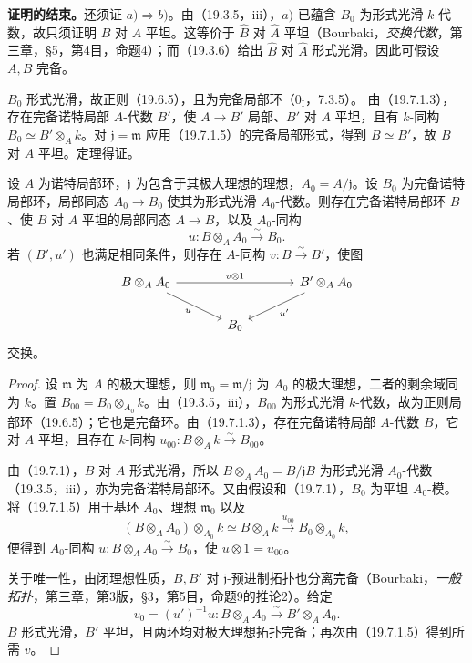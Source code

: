 \textbf{证明的结束。}还须证 $a)\Rightarrow b)$。由（19.3.5，iii），$a)$ 已蕴含 $B_0$ 为形式光滑 $k$-代数，故只须证明 $B$ 对 $A$ 平坦。这等价于 $\widehat B$ 对 $\widehat A$ 平坦（Bourbaki，\textit{交换代数}，第三章，§5，第4目，命题4）；而（19.3.6）给出 $\widehat B$ 对 $\widehat A$ 形式光滑。因此可假设 $A,B$ 完备。

$B_0$ 形式光滑，故正则（19.6.5），且为完备局部环（$0_{\mathrm I}$，7.3.5）。
由（19.7.1.3），存在完备诺特局部 $A$-代数 $B'$，使 $A\to B'$ 局部、$B'$ 对 $A$ 平坦，且有 $k$-同构 $B_0\simeq B'\otimes_Ak$。对 $\mathfrak j=\mathfrak m$ 应用（19.7.1.5）的完备局部形式，得到 $B\simeq B'$，故 $B$ 对 $A$ 平坦。定理得证。\finishproof

设 $A$ 为诺特局部环，$\mathfrak j$ 为包含于其极大理想的理想，$A_0=A/\mathfrak j$。设 $B_0$ 为完备诺特局部环，局部同态 $A_0\to B_0$ 使其为形式光滑 $A_0$-代数。则存在完备诺特局部环 $B$、使 $B$ 对 $A$ 平坦的局部同态 $A\to B$，以及 $A_0$-同构
\[
 u:B\otimes_AA_0\xrightarrow{\sim}B_0.
\]
若 $(B',u')$ 也满足相同条件，则存在 $A$-同构 $v:B\xrightarrow{\sim}B'$，使图
\[
\begin{tikzcd}[column sep=large]
 B\otimes_AA_0\arrow[rr,"v\otimes1"]\arrow[dr,"u"']&&
 B'\otimes_AA_0\arrow[dl,"u'"]\\
 &B_0&
\end{tikzcd}
\]
交换。

\begin{proof}
设 $\mathfrak m$ 为 $A$ 的极大理想，则 $\mathfrak m_0=\mathfrak m/\mathfrak j$ 为 $A_0$ 的极大理想，二者的剩余域同为 $k$。置 $B_{00}=B_0\otimes_{A_0}k$。由（19.3.5，iii），$B_{00}$ 为形式光滑 $k$-代数，故为正则局部环（19.6.5）；它也是完备环。由（19.7.1.3），存在完备诺特局部 $A$-代数 $B$，它对 $A$ 平坦，且存在 $k$-同构 $u_{00}:B\otimes_Ak\xrightarrow{\sim}B_{00}$。

由（19.7.1），$B$ 对 $A$ 形式光滑，所以 $B\otimes_AA_0=B/\mathfrak jB$ 为形式光滑 $A_0$-代数（19.3.5，iii），亦为完备诺特局部环。又由假设和（19.7.1），$B_0$ 为平坦 $A_0$-模。将（19.7.1.5）用于基环 $A_0$、理想 $\mathfrak m_0$ 以及
\[
 (B\otimes_AA_0)\otimes_{A_0}k
 \simeq B\otimes_Ak\xrightarrow{u_{00}}B_0\otimes_{A_0}k,
\]
便得到 $A_0$-同构 $u:B\otimes_AA_0\xrightarrow{\sim}B_0$，使 $u\otimes1=u_{00}$。

关于唯一性，由闭理想性质，$B,B'$ 对 $\mathfrak j$-预进制拓扑也分离完备（Bourbaki，\textit{一般拓扑}，第三章，第3版，§3，第5目，命题9的推论2）。给定
\[
 v_0=(u')^{-1}u:B\otimes_AA_0\xrightarrow{\sim}B'\otimes_AA_0.
\]
$B$ 形式光滑，$B'$ 平坦，且两环均对极大理想拓扑完备；再次由（19.7.1.5）得到所需 $v$。
\end{proof}

